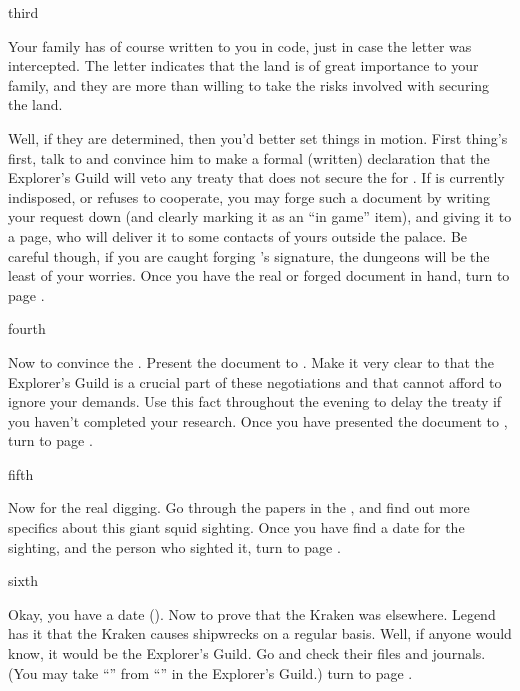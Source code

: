 \documentclass[greennotebook]{NeptuneBall}
\begin{document}
\begin{page}{third}

Your family has of course written to you in code, just in case the letter was intercepted. The letter indicates that the land is of great importance to your family, and they are more than willing to take the risks involved with securing the land. 

Well, if they are determined, then you'd better set things in motion. First thing's first, talk to \cPlant{} and convince him to make a formal (written) declaration that the Explorer's Guild will veto any treaty that does not secure the \pGazaStrip{} for \pAtlantis{}. If \cPlant{\they} is currently indisposed, or refuses to cooperate, you may forge such a document by writing your request down (and clearly marking it as an ``in game'' item), and giving it to a page, who will deliver it to some contacts of yours outside the palace. Be careful though, if you are caught forging \cPlant{}'s signature, the dungeons will be the least of your worries. Once you have the real or forged document in hand, turn to page .

\end{page}

\begin{page}{fourth}

Now to convince the \cKing{\King}. Present the document to \cKing{\King} \cKing{}. Make it very clear to \cKing{\them} that the Explorer's Guild is a crucial part of these negotiations and that \cKing{\they} cannot afford to ignore your demands. Use this fact throughout the evening to delay the treaty if you haven't completed your research. Once you have presented the document to \cKing{}, turn to page .

\end{page}

\begin{page}{fifth}

Now for the real digging. Go through the papers in the \sEmbassy{}, and find out more specifics about this giant squid sighting. Once you have find a date for the sighting, and the person who sighted it, turn to page .

\end{page}

\begin{page}{sixth}

Okay, you have a date (\cKraken{\MYname}). Now to prove that the Kraken was elsewhere. Legend has it that the Kraken causes shipwrecks on a regular basis. Well, if anyone would know, it would be the Explorer's Guild. Go and check their files and journals. (You may take ``\iNorthSeasJournal{}'' from ``\sJournals{}'' in the Explorer's Guild.)  turn to page .

\end{page}
\end{document}
